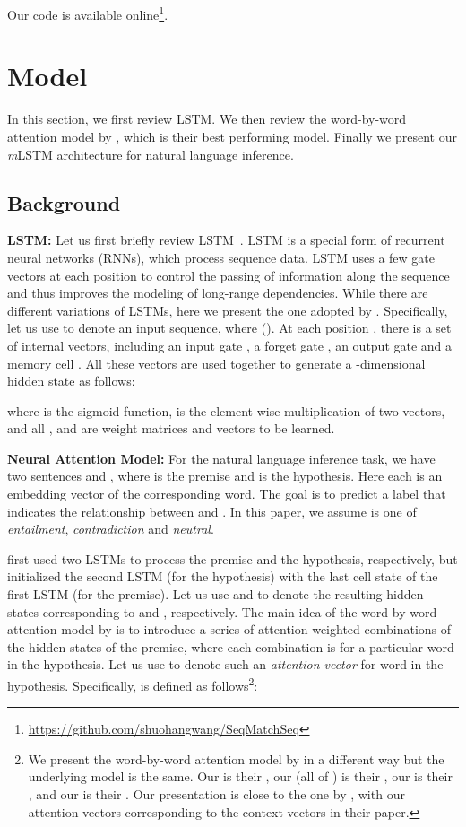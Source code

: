 \documentclass[11pt,letterpaper]{article}
\begin{document}
Our code is available online\footnote{\url{https://github.com/shuohangwang/SeqMatchSeq}}. 
 \section{Model}

In this section, we first review LSTM.
We then review the word-by-word attention model by , which is their best performing model.
Finally we present our \emph{m}LSTM architecture for natural language inference.

\subsection{Background}

\noindent \textbf{LSTM:} Let us first briefly review LSTM~\cite{hochreiter:nc97}.
LSTM is a special form of recurrent neural networks (RNNs), which process sequence data.
LSTM uses a few gate vectors at each position to control the passing of information along the sequence and thus improves the modeling of long-range dependencies.
While there are different variations of LSTMs, here we present the one adopted by .
Specifically, let us use  to denote an input sequence, where   ().
At each position , there is a set of internal vectors, including an input gate , a forget gate , an output gate  and a memory cell .
All these vectors are used together to generate a -dimensional hidden state  as follows:

\small

\normalsize
where  is the sigmoid function,  is the element-wise multiplication of two vectors, and all , and  are weight matrices and vectors to be learned.

\noindent \textbf{Neural Attention Model:} For the natural language inference task, we have two sentences  and , where  is the premise and  is the hypothesis.
Here each  is an embedding vector of the corresponding word.
The goal is to predict a label  that indicates the relationship between  and .
In this paper, we assume  is one of \emph{entailment}, \emph{contradiction} and \emph{neutral}.

 first used two LSTMs to process the premise and the hypothesis, respectively, but initialized the second LSTM (for the hypothesis) with the last cell state of the first LSTM (for the premise).
Let us use  and  to denote the resulting hidden states corresponding to  and , respectively.
The main idea of the word-by-word attention model by  is to introduce a series of attention-weighted combinations of the hidden states of the premise, where each combination is for a particular word in the hypothesis.
Let us use  to denote such an \emph{attention vector} for word  in the hypothesis.
Specifically,  is defined as follows\footnote{We present the word-by-word attention model by  in a different way but the underlying model is the same. 
Our  is their ,  our  (all of ) is their , our  is their , and our  is their .
Our presentation is close to the one by , with our attention vectors  corresponding to the context vectors  in their paper. }:
\end{document}
